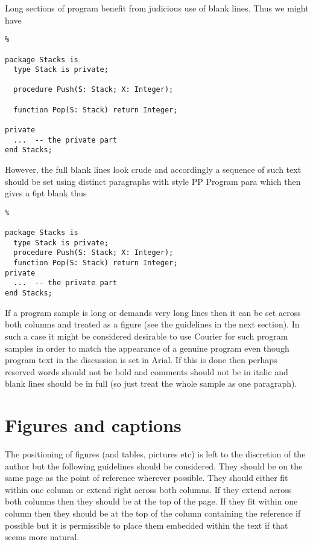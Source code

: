 \documentclass{AUJarticle}
\begin{document}
Long sections of program benefit from judicious use of blank lines. Thus we might have

\begin{lstlisting}%

package Stacks is
  type Stack is private;

  procedure Push(S: Stack; X: Integer);

  function Pop(S: Stack) return Integer;

private
  ...  -- the private part
end Stacks;
\end{lstlisting}

However, the full blank lines look crude and accordingly a sequence of such text should be set
using distinct paragraphs with style PP Program para which then gives a 6pt blank thus

\begin{lstlisting}%

package Stacks is
  type Stack is private;
  procedure Push(S: Stack; X: Integer);
  function Pop(S: Stack) return Integer;
private
  ...  -- the private part
end Stacks;
\end{lstlisting}


If a program sample is long or demands very long lines then it can be set across both columns
and treated as a figure (see the guidelines in the next section). In such a case it might be
considered desirable to use Courier for such program samples in order to match the appearance of
a genuine program even though program text in the discussion is set in Arial. If this is done
then perhaps reserved words should not be bold and comments should not be in italic and blank
lines should be in full (so just treat the whole sample as one paragraph).

\section{Figures and captions}

The positioning of figures (and tables, pictures etc) is left to the discretion of the author
but the following guidelines should be considered. They should be on the same page as the point
of reference wherever possible. They should either fit within one column or extend right across
both columns. If they extend across both columns then they should be at the top of the page. If
they fit within one column then they should be at the top of the column containing the reference
if possible but it is permissible to place them embedded within the text if that seems more
natural.
\end{document}
